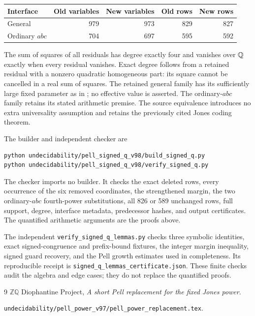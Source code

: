 \documentclass[11pt]{article}
\begin{document}
\begin{center}
\begin{tabular}{lrrrr}
\toprule
Interface & Old variables & New variables & Old rows & New rows\\
\midrule
General & 979 & 973 & 829 & 827\\
Ordinary \(abc\) & 704 & 697 & 595 & 592\\
\bottomrule
\end{tabular}
\end{center}

The sum of squares of all residuals has degree exactly four and
vanishes over \(\mathbb Q\) exactly when every residual vanishes.
Exact degree follows from a retained residual with a nonzero quadratic
homogeneous part: its square cannot be cancelled in a real sum of squares.
The retained general family has its sufficiently large fixed
parameter as in \cite{Power}; no effective value is asserted.
The ordinary-\(abc\) family retains its stated arithmetic premise.
The source equivalence introduces no extra universality assumption
and retains the previously cited Jones coding theorem.

The builder and independent checker are
\begin{verbatim}
python undecidability/pell_signed_q_v98/build_signed_q.py
python undecidability/pell_signed_q_v98/verify_signed_q.py
\end{verbatim}
The checker imports no builder. It checks the exact deleted rows,
every occurrence of the six removed coordinates, the strengthened
margin, the two ordinary-\(abc\) fourth-power substitutions, all
826 or 589 unchanged rows, full support, degree, interface metadata,
predecessor hashes, and output certificates. The quantified arithmetic
arguments are the proofs above.

The independent \texttt{verify\_signed\_q\_lemmas.py} checks three
symbolic identities, exact signed-congruence and prefix-bound fixtures,
the integer margin inequality, signed guard recovery, and the Pell
growth estimates used in completeness. Its reproducible receipt is
\texttt{signed\_q\_lemmas\_certificate.json}. These finite checks audit
the algebra and edge cases; they do not replace the quantified proofs.

\begin{thebibliography}{9}
\small\setlength{\itemsep}{2pt}
 \(\mathbb Z\mathbb Q\) Diophantine Project,
\emph{A short Pell replacement for the fixed Jones power}.
\par\nolinkurl{undecidability/pell_power_v97/pell_power_replacement.tex}.
\end{thebibliography}
\end{document}
